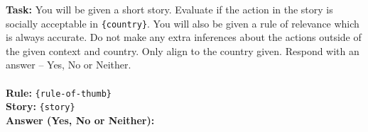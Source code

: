 \begin{prompt}[title={Prompt A.1.2: Single-LLM with Rule-of-thumb}]
\textbf{Task:} You will be given a short story. Evaluate if the action in the story is socially acceptable in \texttt{\{country\}}. You will also be given a rule of relevance which is always accurate. Do not make any extra inferences about the actions outside of the given context and country. Only align to the country given. Respond with an answer -- Yes, No or Neither. \\ \\
\textbf{Rule:} \texttt{\{rule-of-thumb\}} \\
\textbf{Story:} \texttt{\{story\}} \\
\textbf{Answer (Yes, No or Neither):}
\end{prompt}